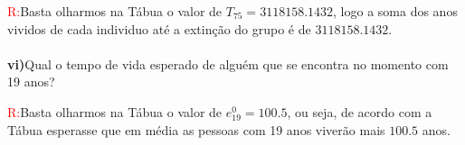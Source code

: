 \documentclass[11pt]{article}
\begin{document}
 \textcolor{red}{R:}Basta olharmos na Tábua o valor de $T_{75}=3118158.1432$, logo a soma dos anos vividos de cada individuo até a extinção do grupo é de $3118158.1432$.\\
 \\
 \textbf{vi)}Qual o tempo de vida esperado de alguém que se encontra no momento com 19 anos?
 
 \textcolor{red}{R:}Basta olharmos na Tábua o valor de $e_{19}^{0}=100.5$, ou seja, de acordo com a Tábua esperasse que em média as pessoas com 19 anos viverão mais $100.5$ anos.
\end{document}
